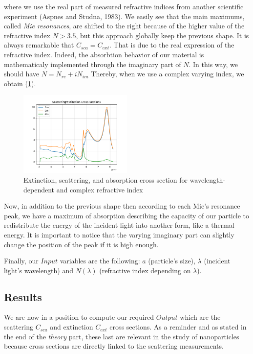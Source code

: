 \documentclass{article}
\numberwithin{equation}{section}
\begin{document}
where we use the real part of measured refractive indices from another scientific experiment (Aspnes and Studna, 1983). We easily see that the main maximums, called \textit{Mie resonances}, are shifted to the right because of the higher value of the refractive index $N>3.5$, but this approach globally keep the previous shape. It is always remarkable that $C_{sca}=C_{ext}$. That is due to the real expression of the refractive index. Indeed, the absorbtion behavior of our material is mathematicaly implemented through the imaginary part of $N$. In this way, we should have $N=N_{re}+iN_{im}$ Thereby, when we use a complex varying index, we obtain (\ref{fig:ri_var_complex}).
\begin{figure}[h!]
    \centering
    \includegraphics[width=0.5\textwidth, height=0.4\textwidth]{ri_var_complex.png}
    \caption{Extinction, scattering, and absorption cross section for wavelength-dependent and complex refractive index}
    \label{fig:ri_var_complex}
\end{figure}
Now, in addition to the previous shape then according to each Mie's resonance peak, we have a maximum of absorption describing the capacity of our particle to redistribute the energy of the incident light into another form, like a thermal energy. It is important to notice that the varying imaginary part can slightly change the position of the peak if it is high enough.

Finally, our $Input$ variables are the following: $a$ (particle's size), $\lambda$ (incident light's wavelength) and $N(\lambda)$ (refractive index depending on $\lambda$).

\subsection{Results}

We are now in a position to compute our required $Output$ which are the scattering $C_{sca}$ and extinction $C_{ext}$ cross sections. As a reminder and as stated in the end of the \textit{theory} part, these last are relevant in the study of nanoparticles because cross sections are directly linked to the scattering measurements.
\end{document}
